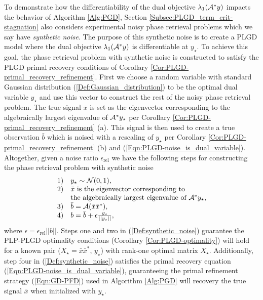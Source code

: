 To demonstrate how the differentiability of the dual objective $\lambda_1({\mathcal A}^*y)$ impacts the behavior of Algorithm \ref{Alg:PGD}, Section \ref{Subsec:PLGD_term_crit-stagnation} also considers experimental noisy phase retrieval problems which we say have \textit{synthetic noise}.
The purpose of this synthetic noise is to create a PLGD model where the dual objective $\lambda_1({\mathcal A}^*y)$ is differentiable at $y_\star$.  
To achieve this goal, the phase retrieval problem with synthetic noise is constructed to satisfy the PLGD primal recovery conditions of Corollary \ref{Cor:PLGD-primal_recovery_refinement}.  First we choose a random variable with standard Gaussian distribution (\ref{Def:Gaussian_distribution}) to be the optimal dual variable $y_\star$ and use this vector to construct the rest of the noisy phase retrieval problem.  The true signal $\bar{x}$ is set as the eigenvector corresponding to the algebraically largest eigenvalue of ${\mathcal A}^*y_\star$ per Corollary \ref{Cor:PLGD-primal_recovery_refinement} (a).  This signal is then used to create a true observation $\bar{b}$ which is noised with a rescaling of $y_\star$ per Corollary \ref{Cor:PLGD-primal_recovery_refinement} (b) and  (\ref{Eqn:PLGD-noise_is_dual_variable}).  Altogether, given a noise ratio $\epsilon_\text{rel}$ we have the following steps for constructing the phase retrieval problem with synthetic noise
\begin{equation} 			\label{Def:synthetic_noise}
\begin{array}{ll}
1)	&	y_\star \sim {\mathcal N}(0,1), 	\\
2) & \bar{x} \text{ is the eigenvector corresponding to } \\
	&	\text{the algebraically largest eigenvalue of } {\mathcal A}^*y_\star, \\
3) & \bar{b} = {\mathcal A}(\bar{x}\bar{x}^*), \\
4) & b = \bar{b} + \epsilon \frac{y_\star}{|| y_\star ||},
\end{array}
\end{equation}
where $\epsilon = \epsilon_\text{rel}||b||$.  
Steps one and two in (\ref{Def:synthetic_noise}) guarantee the PLP-PLGD optimality conditions (Corollary \ref{Cor:PLGD-optimality}) will hold for a known pair ($X_\star = \bar{x}\bar{x}^*$, $y_\star$) with rank-one optimal matrix $X_\star$.  
Additionally, step four in (\ref{Def:synthetic_noise}) satisfies the primal recovery equation (\ref{Eqn:PLGD-noise_is_dual_variable}), guaranteeing the primal refinement strategy (\ref{Eqn:GD-PFD}) used in Algorithm \ref{Alg:PGD} will recovery the true signal $\bar{x}$ when initialized with $y_\star$.
